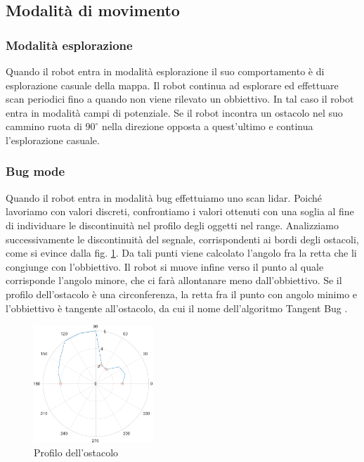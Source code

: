 \documentclass[a4paper]{article}
\begin{document}
	\subsection{Modalità di movimento}\label{subsec:Modalità-di-movimento}
	
	\subsubsection{Modalità esplorazione}
	Quando il robot entra in modalità esplorazione il suo comportamento è di esplorazione casuale della mappa. Il robot continua ad esplorare ed effettuare scan periodici fino a quando non viene rilevato un obbiettivo. In tal caso il robot entra in modalità campi di potenziale. Se il robot incontra un ostacolo nel suo cammino ruota di $90^{\circ}$ nella direzione opposta a quest'ultimo e continua l'esplorazione casuale.
	
	\subsubsection{Bug mode}
	Quando il robot entra in modalità bug effettuiamo uno scan lidar. Poiché lavoriamo con valori discreti, confrontiamo i valori ottenuti con una soglia al fine di individuare le discontinuità nel profilo degli oggetti nel range. Analizziamo successivamente le discontinuità del segnale, corrispondenti ai bordi degli ostacoli, come si evince dalla fig. \ref{fig:bug}. Da tali punti viene calcolato l'angolo fra la retta che li congiunge con l'obbiettivo. Il robot si muove infine verso il punto al quale corrisponde l'angolo minore, che ci farà allontanare meno dall'obbiettivo. Se il profilo dell'ostacolo è una circonferenza, la retta fra il punto con angolo minimo e l'obbiettivo è tangente all'ostacolo, da cui il nome dell'algoritmo Tangent Bug \cite{503814}.
	
	\begin{figure}[H]
		\centering
		\includegraphics[width=0.4\textwidth]{./img/bug.pdf}
		\caption{Profilo dell'ostacolo}
		\label{fig:bug}
	\end{figure}
\end{document}
